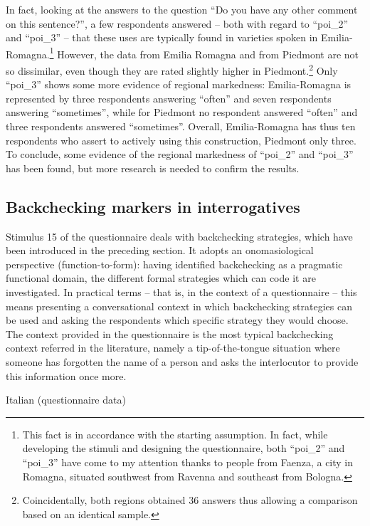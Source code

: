 \largerpage[2]
In fact, looking at the answers to the question “Do you have any other comment on this sentence?”, a few respondents answered – both with regard to “poi\_2” and “poi\_3” – that these uses are typically found in varieties spoken in Emilia-Romagna.{\footnote{This fact is in accordance with the starting assumption. In fact, while developing the stimuli and designing the questionnaire, both “poi\_2” and “poi\_3” have come to my attention thanks to people from Faenza, a city in Romagna, situated southwest from Ravenna and southeast from Bologna.}} However, the data from Emilia Romagna and from Piedmont are not so dissimilar, even though they are rated slightly higher in Piedmont.\footnote{Coincidentally, both regions obtained 36 answers thus allowing a comparison based on an identical sample.} Only “poi\_3” shows some more evidence of regional markedness: Emilia-Romagna is represented by three respondents answering “often” and seven respondents answering “sometimes”, while for Piedmont no respondent answered “often” and three respondents answered “sometimes”. Overall, Emilia-Romagna has thus ten respondents who assert to actively using this construction, Piedmont only three. To conclude, some evidence of the regional markedness of “poi\_2” and “poi\_3” has been found, but more research is needed to confirm the results.

\subsection{Backchecking markers in interrogatives}
\hypertarget{Toc124860687}{}
Stimulus 15 of the questionnaire deals with backchecking strategies, which have been introduced in the preceding section. It adopts an onomasiological perspective (function-to-form): having identified backchecking as a pragmatic functional domain, the different formal strategies which can code it are investigated. In practical terms – that is, in the context of a questionnaire – this means presenting a conversational context in which backchecking strategies can be used and asking the respondents which specific strategy they would choose. The context provided in the questionnaire is the most typical backchecking context referred in the literature, namely a tip-of-the-tongue situation where someone has forgotten the name of a person and asks the interlocutor to provide this information once more.

\ea%
    \label{ex:key:106-1}

          Italian (questionnaire data)

